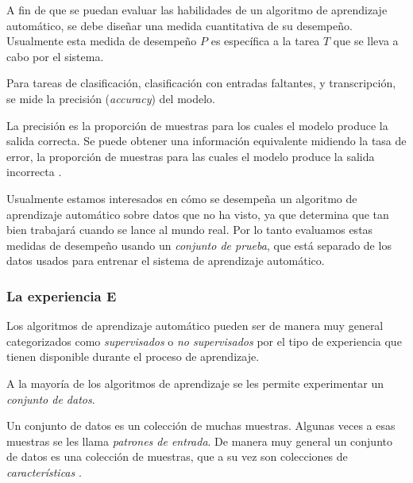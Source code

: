 A fin de que se puedan evaluar las habilidades de un algoritmo de
aprendizaje automático, se debe diseñar una medida cuantitativa de su
desempeño. Usualmente esta medida de desempeño $P$ es específica a la
tarea $T$ que se lleva a cabo por el sistema.

Para tareas de clasificación, clasificación con entradas faltantes, y
transcripción, se mide la precisión (\textit{accuracy}) del modelo. \\

\begin{remark}
La precisión
es la proporción de muestras para los cuales el modelo produce la
salida correcta. Se puede obtener una información equivalente midiendo
la tasa de error, la proporción de muestras para las cuales el modelo
produce la salida incorrecta \cite{iangoodfellowyoshuabengioaaroncourville2017}.
\end{remark}


Usualmente estamos interesados en cómo se desempeña un algoritmo de
aprendizaje automático sobre datos que no ha visto,
ya que determina que tan bien trabajará cuando se lance al mundo real.
Por lo tanto evaluamos estas medidas de desempeño usando un \textit{conjunto de
prueba}, que está separado de los datos usados para entrenar el sistema
de aprendizaje automático.

\subsubsection{La experiencia E}

Los algoritmos de aprendizaje automático pueden ser de manera muy
general categorizados como \textit{supervisados} o \textit{no supervisados} por el tipo de
experiencia que tienen disponible durante el proceso de aprendizaje.

A la mayoría de los algoritmos de aprendizaje se les permite
experimentar un \textit{conjunto de datos}.\\

\begin{remark}
Un conjunto de datos es un
colección de muchas muestras. Algunas veces a esas muestras se les llama
\textit{patrones de entrada}.
De manera muy general un conjunto de datos
es una colección de muestras, que a su vez son colecciones de \textit{características} \cite{iangoodfellowyoshuabengioaaroncourville2017}.
\end{remark}


